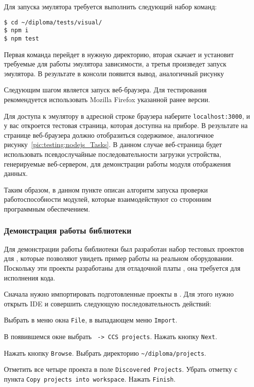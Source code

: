Для запуска эмулятора требуется выполнить следующий набор команд:
\begin{lstlisting}
$ cd ~/diploma/tests/visual/
$ npm i
$ npm test
\end{lstlisting}

Первая команда перейдет в нужную директорию, вторая скачает и установит требуемые
для работы эмулятора зависимости, а третья произведет запуск эмулятора. В результате
в консоли появится вывод, аналогичный рисунку%


Следующим шагом является запуск веб-браузера. Для тестирования
рекомендуется использовать Mozilla Firefox указанной ранее версии.

Для доступа к эмулятору в адресной строке браузера наберите \lstinline{localhost:3000},
и у вас откроется тестовая страница, которая доступна на приборе.
В результате на странице веб-браузера должно отобразиться содержимое,
аналогичное рисунку~\ref{pic:testing:nodejs_Tasks}.
В данном случае веб-страница будет использовать псевдослучайные последовательности
загрузки устройства, генерируемые веб-сервером, для демонстрации работы модуля
отображения данных.

Таким образом, в данном пункте описан алгоритм запуска проверки работоспособности
модулей, которые взаимодействуют со сторонним программным обеспечением.

\subsubsection{Демонстрация работы библиотеки}

Для демонстрации работы библиотеки был разработан набор тестовых проектов
для , которые позволяют увидеть пример работы на реальном оборудовании.
Поскольку эти проекты разработаны для отладочной платы ,
она требуется для исполнения кода.

Сначала нужно импортировать подготовленные проекты в . Для этого нужно
открыть IDE и совершить следующую последовательность действий:
\begin{enumerate_num}
    \item Выбрать в меню окна \lstinline{File}, в выпадающем меню \lstinline{Import}.
    \item В появившемся окне выбрать \texttt{ -> CCS projects}.
    Нажать кнопку \lstinline{Next}.
    \item Нажать кнопку \lstinline{Browse}. Выбрать директорию
    \lstinline{~/diploma/projects}.
    \item Отметить все четыре проекта в поле \lstinline{Discovered Projects}.
    Убрать отметку с пункта \lstinline{Copy projects into workspace}.
    Нажать \lstinline{Finish}.
\end{enumerate_num}

